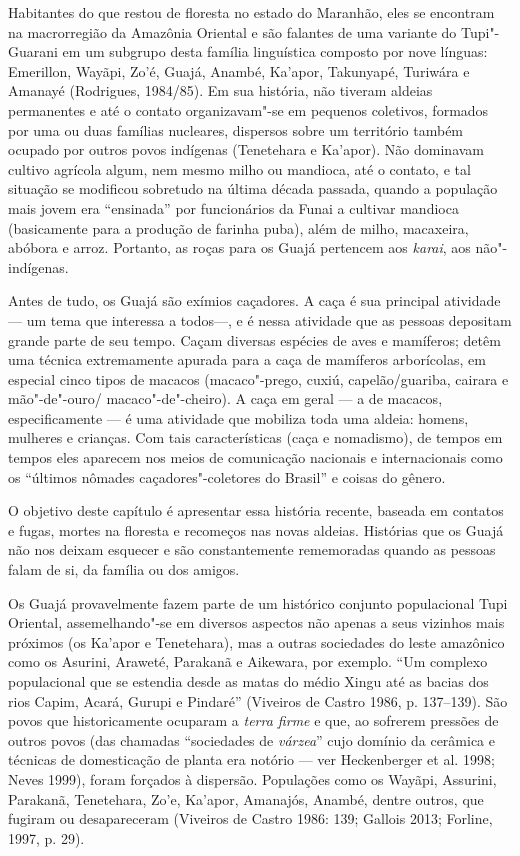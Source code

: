 Habitantes do que restou de floresta no estado do Maranhão, eles se
encontram na macrorregião da Amazônia Oriental e são falantes de uma
variante do Tupi"-Guarani em um subgrupo desta família linguística
composto por nove línguas: Emerillon, Wayãpi, Zo'é, Guajá, Anambé,
Ka'apor, Takunyapé, Turiwára e Amanayé (Rodrigues, 1984/85). Em sua
história, não tiveram aldeias permanentes e até o contato organizavam"-se
em pequenos coletivos, formados por uma ou duas famílias nucleares,
dispersos sobre um território também ocupado por outros povos indígenas
(Tenetehara e Ka'apor). Não dominavam cultivo agrícola algum, nem mesmo
milho ou mandioca, até o contato, e tal situação se modificou sobretudo
na última década passada, quando a população mais jovem era ``ensinada''
por funcionários da Funai a cultivar mandioca (basicamente para a
produção de farinha puba), além de milho, macaxeira, abóbora e arroz.
Portanto, as roças para os Guajá pertencem aos \emph{karai}, aos
não"-indígenas.

Antes de tudo, os Guajá são exímios caçadores. A caça é sua principal
atividade --- um tema que interessa a todos---, e é nessa atividade que as
pessoas depositam grande parte de seu tempo. Caçam diversas espécies de
aves e mamíferos; detêm uma técnica extremamente apurada para a caça de
mamíferos arborícolas, em especial cinco tipos de macacos (macaco"-prego,
cuxiú, capelão/guariba, cairara e mão"-de"-ouro/
macaco"-de"-cheiro). A caça em geral --- a de macacos, especificamente --- é
uma atividade que mobiliza toda uma aldeia: homens, mulheres e crianças.
Com tais características (caça e nomadismo), de tempos em tempos eles
aparecem nos meios de comunicação nacionais e internacionais como os
``últimos nômades caçadores"-coletores do Brasil'' e coisas do gênero.

O objetivo deste capítulo é apresentar essa história recente, baseada em
contatos e fugas, mortes na floresta e recomeços nas novas aldeias.
Histórias que os Guajá não nos deixam esquecer e são constantemente
rememoradas quando as pessoas falam de si, da família ou dos amigos.

Os Guajá provavelmente fazem parte de um histórico conjunto populacional
Tupi Oriental, assemelhando"-se em diversos aspectos não apenas a seus
vizinhos mais próximos (os Ka'apor e Tenetehara), mas a outras
sociedades do leste amazônico como os Asurini, Araweté, Parakanã e
Aikewara, por exemplo. ``Um complexo populacional que se estendia desde
as matas do médio Xingu até as bacias dos rios Capim, Acará, Gurupi e
Pindaré'' (Viveiros de Castro 1986, p. 137--139). São povos que
historicamente ocuparam a \emph{terra firme} e que, ao sofrerem pressões
de outros povos (das chamadas ``sociedades de \emph{várzea}'' cujo
domínio da cerâmica e técnicas de domesticação de planta era notório ---
ver Heckenberger et al. 1998; Neves 1999), foram forçados à dispersão.
Populações como os Wayãpi, Assurini, Parakanã, Tenetehara, Zo'e,
Ka'apor, Amanajós, Anambé, dentre outros, que fugiram ou desapareceram
(Viveiros de Castro 1986: 139; Gallois 2013; Forline, 1997, p. 29).

